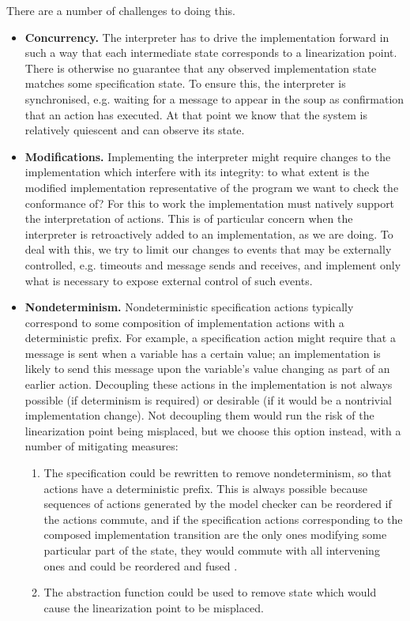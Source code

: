 \documentclass[a4paper]{article}
\begin{document}
There are a number of challenges to doing this.

\begin{itemize}
\item \textbf{Concurrency.} The interpreter has to drive the implementation forward in such a way that each intermediate state corresponds to a linearization point. There is otherwise no guarantee that any observed implementation state matches some specification state. To ensure this, the interpreter is synchronised, e.g. waiting for a message to appear in the soup as confirmation that an action has executed. At that point we know that the system is relatively quiescent and can observe its state.

\item \textbf{Modifications.} Implementing the interpreter might require changes to the implementation which interfere with its integrity: to what extent is the modified implementation representative of the program we want to check the conformance of? For this to work the implementation must natively support the interpretation of actions. This is of particular concern when the interpreter is retroactively added to an implementation, as we are doing. To deal with this, we try to limit our changes to events that may be externally controlled, e.g. timeouts and message sends and receives, and implement only what is necessary to expose external control of such events.


\item \textbf{Nondeterminism.} Nondeterministic specification actions typically correspond to some composition of implementation actions with a deterministic prefix. For example, a specification action might require that a message is sent when a variable has a certain value; an implementation is likely to send this message upon the variable's value changing as part of an earlier action. Decoupling these actions in the implementation is not always possible (if determinism is required) or desirable (if it would be a nontrivial implementation change). Not decoupling them would run the risk of the linearization point being misplaced, but we choose this option instead, with a number of mitigating measures:

\begin{enumerate}
\item The specification could be rewritten to remove nondeterminism, so that actions have a deterministic prefix. This is always possible because sequences of actions generated by the model checker can be reordered if the actions commute, and if the specification actions corresponding to the composed implementation transition are the only ones modifying some particular part of the state, they would commute with all intervening ones and could be reordered and fused \cite{lipton1975reduction}.
\item The abstraction function could be used to remove state which would cause the linearization point to be misplaced.
\end{enumerate}

\end{itemize}
\end{document}
